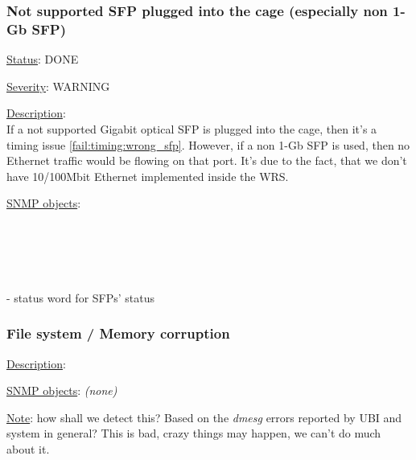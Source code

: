 \subsubsection{\bf Not supported SFP plugged into the cage (especially non 1-Gb SFP)}
		\label{fail:other:sfp}
		\begin{packed_enum}
			\item [] \underline{Status}: DONE
			\item [] \underline{Severity}: WARNING
			\item [] \underline{Description}:\\
				If a not supported Gigabit optical SFP is plugged into the cage, then
				it's a timing issue \ref{fail:timing:wrong_sfp}. However, if a non 1-Gb
				SFP is used, then no Ethernet traffic would be flowing on that port.
				It's due to the fact, that we don't have 10/100Mbit Ethernet implemented
				inside the WRS.
			\item [] \underline{SNMP objects}:\\
				\\
				\\
				\\
				\\
				\\
				 - status word for SFPs' status
		\end{packed_enum}

\subsubsection{\bf File system / Memory corruption}
		\label{fail:other:memory}
		\begin{packed_enum}
			\item [] \underline{Description}:\\
			\item [] \underline{SNMP objects}: \emph{(none)}
			\item [] \underline{Note}: how shall we detect this? Based on the
				\emph{dmesg} errors reported by UBI and system in general?  This is bad,
				crazy things may happen, we can't do much about it.
		\end{packed_enum}


